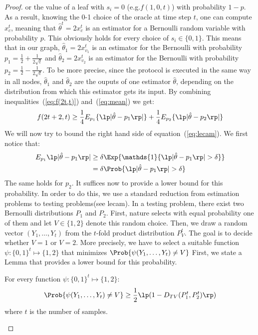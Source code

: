 \begin{proof}
or the value of a leaf with $s_i = 0$ (e.g.$f(1,0,t)$) with probability $1-p$. As a result, knowing the 0-1 choice of the oracle at time step $t$, one can compute $x_c^t$, 
meaning that $\hat{\theta}^t = 2x_c^t$ is an estimator for a Bernoulli random variable with probability $p$. This obviously holds for every choice of $s_i \in \{0,1\}$. 
This means that in our graph, $\hat{\theta}_1 = 2x_{v_1}^t$ is an estimator for the Bernoulli with probability $p_1 = \frac{1}{2}+\frac{1}{2\sqrt{t}}$ 
and $\hat{\theta}_2 = 2x_{v_2}^t$ is an estimator for the Bernoulli with probability $p_2 = \frac{1}{2}-\frac{1}{2\sqrt{t}}$.
To be more precise, since the protocol is executed in the same way in all nodes, $\hat{\theta}_1$ and $\hat{\theta}_2$ are the ouputs of one estimator $\hat{\theta}$, depending on the distribution 
from which this estimator gets its input. 
By combining inequalities~(\ref{eq:f(2t,t)}) and~(\ref{eq:mean}) we get:
\begin{equation}\label{eq:lecam}
f(2t+2,t) \geq \frac{1}{4} E_{p_1}\{\lp|\hat{\theta} - p_1\rp|\} + \frac{1}{4} E_{p_2}\{\lp|\hat{\theta} - p_2\rp|\}
\end{equation}
We will now try to bound the right hand side of equation~(\ref{eq:lecam}).
We first notice that:
\begin{align*}
E_{p_1}{\lp|\hat{\theta} - p_1\rp|} &\geq \delta \Exp{\mathds{1}\{\lp|\hat{\theta} - p_1\rp| > \delta\}}\\
&= \delta \Prob{\lp|\hat{\theta} - p_1\rp| > \delta}
\end{align*}
The same holds for $p_2$. It suffices now to provide a lower bound for this probability. 
In order to do this, we use a standard reduction from estimation problems to testing problems(see lecam). 
In a testing problem, there exist two Bernoulli distributions $P_1$ and $P_2$. First, nature selects with equal probability one of them and let $V \in \{1,2\}$ denote this random choice. 
Then, we draw a random vector $(Y_1,\ldots, Y_t)$ from the $t$-fold product distribution $P_V^t$. 
The goal is to decide whether $V=1$ or $V=2$. More precisely, we have to select a suitable function $\psi:\{0,1\}^t\mapsto \{1,2\}$ that minimizes $\Prob{\psi(Y_1,\ldots,Y_t) \neq V}$ 
First, we state a Lemma that provides a lower bound for this probability.
\begin{lemma}\label{l:lecam_lemma}
For every function $\psi:\{0,1\}^t\mapsto \{1,2\}$:
$$
\Prob{\psi(Y_1,\ldots,Y_t) \neq V} \geq \frac{1}{2} \lp(1 - D_{TV}(P_1^t, P_2^t)\rp)
$$
where $t$ is the number of samples.
\end{lemma}

\end{proof}
